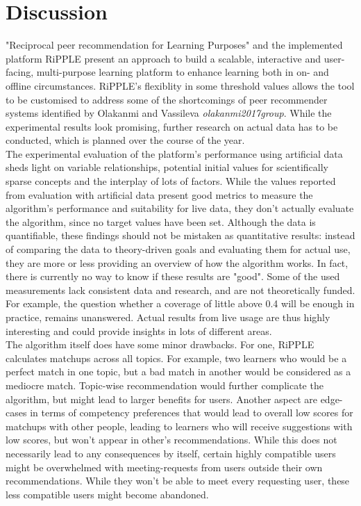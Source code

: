 \documentclass[nochapterpage,bigchapter,linedtoc,longdoc,colorback,accentcolor=tud3b,oneside]{tudreport}
\begin{document}
\section{Discussion} \label{paper:discussion}
"Reciprocal peer recommendation for Learning Purposes" and the implemented platform RiPPLE present an approach to build a scalable, interactive and user-facing, multi-purpose learning platform to enhance learning both in on- and offline circumstances. RiPPLE's flexiblity in some threshold values allows the tool to be customised to address some of the shortcomings of peer recommender systems identified by Olakanmi and Vassileva \textit{olakanmi2017group}. While the experimental results look promising, further research on actual data has to be conducted, which is planned over the course of the year.\\
The experimental evaluation of the platform's performance using artificial data sheds light on variable relationships, potential initial values for scientifically sparse concepts and the interplay of lots of factors. While the values reported from evaluation with artificial data present good metrics to measure the algorithm's performance and suitability for live data, they don't actually evaluate the algorithm, since no target values have been set. Although the data is quantifiable, these findings should not be mistaken as quantitative results: instead of comparing the data to theory-driven goals and evaluating them for actual use, they are more or less providing an overview of how the algorithm works. In fact, there is currently no way to know if these results are "good". Some of the used measurements lack consistent data and research, and are not theoretically funded. For example, the question whether a coverage of little above 0.4 will be enough in practice, remains unanswered. Actual results from live usage are thus highly interesting and could provide insights in lots of different areas.\\
The algorithm itself does have some minor drawbacks. For one, RiPPLE calculates matchups across all topics. For example, two learners who would be a perfect match in one topic, but a bad match in another would be considered as a mediocre match. Topic-wise recommendation would further complicate the algorithm, but might lead to larger benefits for users. Another aspect are edge-cases in terms of competency preferences that would lead to overall low scores for matchups with other people, leading to learners who will receive suggestions with low scores, but won't appear in other's recommendations. While this does not necessarily lead to any consequences by itself, certain highly compatible users might be overwhelmed with meeting-requests from users outside their own recommendations. While they won't be able to meet every requesting user, these less compatible users might become abandoned.\\
\end{document}
